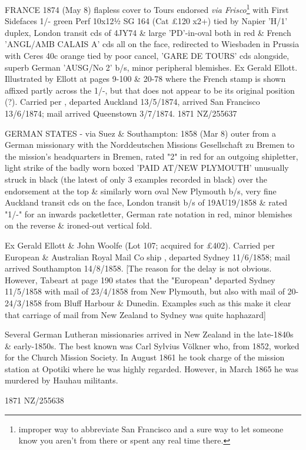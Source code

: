 \documentclass[justified]{tufte-book}
\begin{document}
%
{FRANCE 1874 (May 8) flapless cover to Tours endorsed \textit{via Frisco}\footnote{improper way to abbreviate San Francisco and a sure way to let someone know you aren't from there or spent any real time there.} with First Sidefaces 1/- green Perf 10x12½ SG 164 (Cat £120 x2+) tied by Napier 'H/1' duplex, London transit cds of 4JY74 \& large 'PD'-in-oval both in red \& French 'ANGL/AMB CALAIS A' cds all on the face, redirected to Wiesbaden in Prussia with Ceres 40c orange tied by poor cancel, 'GARE DE TOURS' cds alongside, superb German 'AUSG/No 2' b/s, minor peripheral blemishes. Ex Gerald Ellott. Illustrated by Ellott at pages 9-100 \& 20-78 where the French stamp is shown affixed partly across the 1/-, but that does not appear to be its original position (?). Carried per , departed Auckland 13/5/1874, arrived San Francisco 13/6/1874; mail arrived Queenstown 3/7/1874.}%
{1871}%
{NZ/255637}%
{}%
{}
{}%
{}


%
{GERMAN STATES - via Suez \& Southampton: 1858 (Mar 8) outer from a German missionary with the Norddeutschen Missions Gesellschaft zu Bremen to the mission's headquarters in Bremen, rated "2" in red for an outgoing shipletter, light strike of the badly worn boxed 'PAID AT/NEW PLYMOUTH' unusually struck in black (the latest of only 3 examples recorded in black) over the endorsement at the top \& similarly worn oval New Plymouth b/s, very fine Auckland transit cds on the face, London transit b/s of 19AU19/1858 \& rated "1/-" for an inwards packetletter, German rate notation in red, minor blemishes on the reverse \& ironed-out vertical fold. 

Ex Gerald Ellott \& John Woolfe (Lot 107; acquired for £402). Carried per European \& Australian Royal Mail Co ship , departed Sydney 11/6/1858; mail arrived Southampton 14/8/1858. [The reason for the delay is not obvious. However, Tabeart at page 190 states that the "European" departed Sydney 11/5/1858 with mail of 23/4/1858 from New Plymouth, but also with mail of 20-24/3/1858 from Bluff Harbour \& Dunedin. Examples such as this make it clear that carriage of mail from New Zealand to Sydney was quite haphazard]

Several German Lutheran missionaries arrived in New Zealand in the late-1840s \& early-1850s. The best known was Carl Sylvius V\"olkner who, from 1852, worked for the Church Mission Society. In August 1861 he took charge of the mission station at Opotiki where he was highly regarded. However, in March 1865 he was murdered by Hauhau militants.}%
{1871}%
{NZ/255638}%
{}%
{}
{}%
{}
\end{document}
